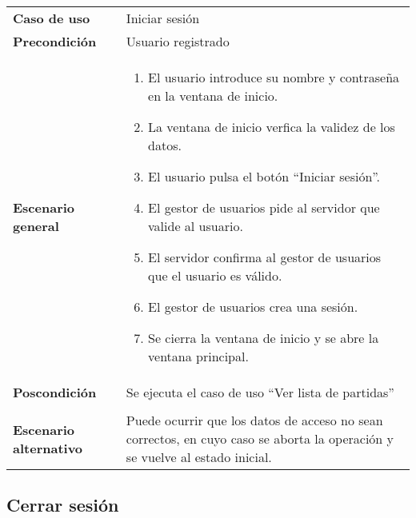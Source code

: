 {\footnotesize
\begin{tabularx}{0.95\textwidth}{p{}|X}

\textbf{Caso de uso} & Iniciar sesión \\

\textbf{Precondición} & Usuario registrado \\

\textbf{Escenario general} & \begin{enumerate}
\item El usuario introduce su nombre y contraseña en la ventana de inicio.
\item La ventana de inicio verfica la validez de los datos.
\item El usuario pulsa el botón ``Iniciar sesión''.
\item El gestor de usuarios pide al servidor que valide al usuario.
\item El servidor confirma al gestor de usuarios que el usuario es válido.
\item El gestor de usuarios crea una sesión.
\item Se cierra la ventana de inicio y se abre la ventana principal.
\end{enumerate} \\

\textbf{Poscondición} & Se ejecuta el caso de uso ``Ver lista de partidas''
\\ \\

\textbf{Escenario alternativo} & Puede ocurrir que los datos de acceso no sean
correctos, en cuyo caso se aborta la operación y se vuelve al estado inicial.

\end{tabularx}
}

\subsection{Cerrar sesión}

